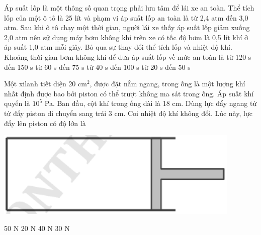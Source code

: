 \documentclass[12pt,a4paper]{article}
\begin{document}
\begin{ex}
	Áp suất lốp là một thông số quan trọng phải lưu tâm để lái xe an toàn. Thể tích lốp của một ô tô là 25 lít và phạm vi áp suất lốp an toàn là từ 2,4 atm đến 3,0 atm. Sau khi ô tô chạy một thời gian, người lái xe thấy áp suất lốp giảm xuống 2,0 atm nên sử dụng máy bơm không khí trên xe có tốc độ bơm là 0,5 lít khí ở áp suất 1,0 atm mỗi giây. Bỏ qua sự thay đổi thể tích lốp và nhiệt độ khí. Khoảng thời gian bơm không khí để đưa áp suất lốp về mức an toàn là
	\choice
	{từ 120 s đến 150 s}
	{từ 60 s đến 75 s}
	{từ 40 s đến 100 s}
	{từ 20 s đến 50 s}
\end{ex}

\begin{ex}
	Một xilanh tiết diện $20 \text{ cm}^2$, được đặt nằm ngang, trong ống là một lượng khí nhất định được bao bởi piston có thể trượt không ma sát trong ống. Áp suất khí quyển là $10^5$ Pa. Ban đầu, cột khí trong ống dài là 18 cm. Dùng lực đẩy ngang từ từ đẩy piston di chuyển sang trái 3 cm. Coi nhiệt độ khí không đổi. Lúc này, lực đẩy lên piston có độ lớn là
		\begin{center}
		\includegraphics[scale=0.3]{img/2.png}
	\end{center}
	\choice
	{50 N}
	{20 N}
	{40 N}
	{30 N}
\end{ex}
\end{document}
